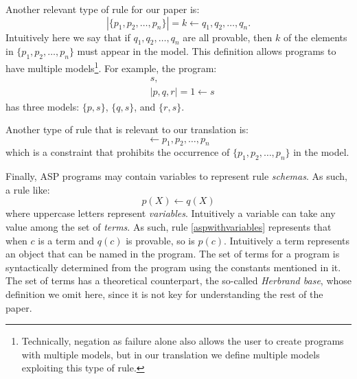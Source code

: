 Another relevant type of rule for our paper is:
\begin{equation*}
    |\{p_1,p_2,\ldots,p_n\}|=k \leftarrow q_1,q_2,\ldots,q_n.
\end{equation*}
Intuitively here we say that if $q_1,q_2,\ldots,q_n$ are all provable, then $k$ of the elements in $\{p_1,p_2,\ldots,p_n\}$ must appear in the model. This definition allows programs to have multiple models\footnote{Technically, negation as failure alone also allows the user to create programs with multiple models, but in our translation we define multiple models exploiting this type of rule.}. For example, the program:
\begin{align*}
    &s,\\
    &|{p,q,r}|=1\leftarrow s
\end{align*}
has three models: $\{p,s\}$, $\{q,s\}$, and $\{r,s\}$.

Another type of rule that is relevant to our translation is:
\begin{equation}
    \leftarrow p_1,p_2,\ldots,p_n
\end{equation}
which is a constraint that prohibits the occurrence of $\{p_1,p_2,\ldots,p_n\}$ in the model.

Finally, ASP programs may contain variables to represent rule \emph{schemas}. As such, a rule like:
\begin{equation}\label{aspwithvariables}
    p(X)\leftarrow q(X)
\end{equation}
where uppercase letters represent \emph{variables}. Intuitively a variable can take any value among the set of \emph{terms}. As such, rule \eqref{aspwithvariables} represents that when $c$ is a term and $q(c)$ is provable, so is $p(c)$. Intuitively a term represents an object that can be named in the program. The set of terms for a program is syntactically determined from the program using the constants mentioned in it. The set of terms has a theoretical counterpart, the so-called \emph{Herbrand base}, whose definition we omit here, since it is not key for understanding the rest of the paper.

